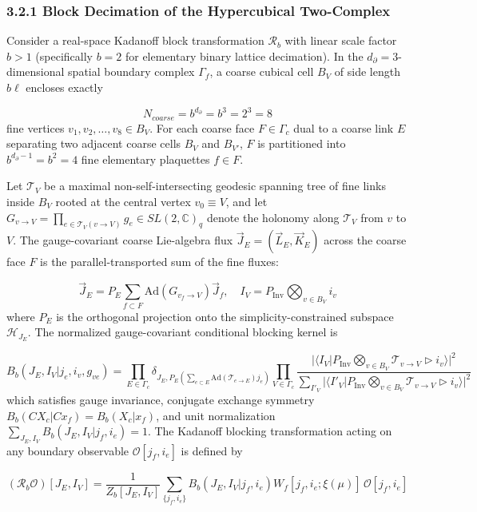 \documentclass[aps,prd,onecolumn,superscriptaddress,nofootinbib,longbibliography,10pt]{revtex4-2}
\begin{document}
{{  
\subsubsection*{3.2.1 Block Decimation of the Hypercubical Two-Complex}

  Consider a real-space Kadanoff block transformation \(\mathcal{R}_b\) with linear scale factor \(b > 1\) (specifically \(b = 2\) for elementary binary lattice decimation). In the \(d_\partial = 3\)-dimensional spatial boundary complex \(\Gamma_f\), a coarse cubical cell \(B_V\) of side length \(b\ell\) encloses exactly


  \[ N_{coarse} = b^{d_\partial} = b^3 = 2^3 = 8 \]
  fine vertices \(v_1, v_2, \dots, v_8 \in B_V\). For each coarse face \(F \in \Gamma_c\) dual to a coarse link \(E\) separating two adjacent coarse cells \(B_V\) and \(B_{V'}\), \(F\) is partitioned into \(b^{d_\partial - 1} = b^2 = 4\) fine elementary plaquettes \(f \in F\).


  Let \(\mathcal{T}_V\) be a maximal non-self-intersecting geodesic spanning tree of fine links inside \(B_V\) rooted at the central vertex \(v_0 \equiv V\), and let \(G_{v\to V} = \prod_{e\in\mathcal{T}_V(v\to V)} g_e \in SL(2,\mathbb{C})_q\) denote the holonomy along \(\mathcal{T}_V\) from \(v\) to \(V\). The gauge-covariant coarse Lie-algebra flux \(\vec{J}_E = (\vec{L}_E, \vec{K}_E)\) across the coarse face \(F\) is the parallel-transported sum of the fine fluxes:


  \[ \vec{J}_E = P_E \sum_{f\subset F} \text{Ad}\left(G_{v_f\to V}\right)\vec{J}_f, \quad I_V = P_{\text{Inv}} \bigotimes_{v\in B_V} i_v \]
  where \(P_E\) is the orthogonal projection onto the simplicity-constrained subspace \(\mathcal{H}_{J_E}\). The normalized gauge-covariant conditional blocking kernel is


  \[ B_b(J_E, I_V | j_e, i_v, g_{ve}) = \prod_{E\in\Gamma_c} \delta_{J_E, P_E(\sum_{e\subset E}\text{Ad}(\mathcal{T}_{e\to E})j_e)} \prod_{V\in\Gamma_c} \frac{|\langle I_V | P_{\text{Inv}}\bigotimes_{v\in B_V} \mathcal{T}_{v\to V} \triangleright i_v \rangle|^2}{\sum_{I'_V} |\langle I'_V | P_{\text{Inv}}\bigotimes_{v\in B_V} \mathcal{T}_{v\to V} \triangleright i_v \rangle|^2} \]
  which satisfies gauge invariance, conjugate exchange symmetry \(B_b(CX_c|Cx_f) = B_b(X_c|x_f)\), and unit normalization \(\sum_{J_E, I_V} B_b(J_E, I_V | j_f, i_e) = 1\). The Kadanoff blocking transformation acting on any boundary observable \(\mathcal{O}[j_f, i_e]\) is defined by


  \[ (\mathcal{R}_b\mathcal{O})[J_E, I_V] = \frac{1}{Z_b[J_E, I_V]}\sum_{\{j_f, i_e\}} B_b(J_E, I_V | j_f, i_e) W_f[j_f, i_e; \xi(\mu)]\,\mathcal{O}[j_f, i_e] \]

}}
\end{document}
